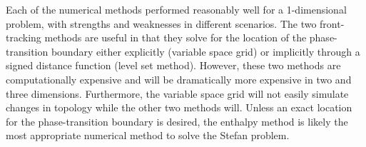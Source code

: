 \documentclass[12pt]{article}
\begin{document}
Each of the numerical methods performed reasonably well for a 1-dimensional problem, with strengths and weaknesses in different scenarios. The two front-tracking methods are useful in that they solve for the location of the phase-transition boundary either explicitly (variable space grid) or implicitly through a signed distance function (level set method). However, these two methods are computationally expensive and will be dramatically more expensive in two and three dimensions. Furthermore, the variable space grid will not easily simulate changes in topology while the other two methods will. Unless an exact location for the phase-transition boundary is desired, the enthalpy method is likely the most appropriate numerical method to solve the Stefan problem.

\vspace{5em}



\end{document}

